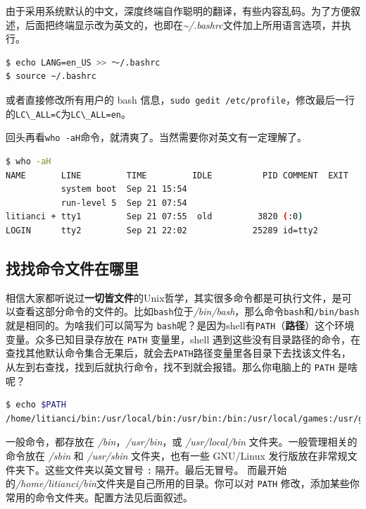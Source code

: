 \documentclass[doctor,openright,twoside]{sjtuthesis}
\newcommand{\passthrough}[1]{#1}
\theoremstyle{plain}
\theoremstyle{definition}
\theoremstyle{remark}
\theoremstyle{ocrenumbox}
\theoremstyle{plain}
\begin{document}
由于采用系统默认的中文，深度终端自作聪明的翻译，有些内容乱码。为了方便叙述，后面把终端显示改为英文的，也即在\emph{\textasciitilde/.bashrc}文件加上所用语言选项，并执行。

\begin{lstlisting}[language=bash]
$ echo LANG=en_US >> ～/.bashrc
$ source ~/.bashrc
\end{lstlisting}

或者直接修改所有用户的 bash 信息，\passthrough{\lstinline!sudo gedit /etc/profile!}，修改最后一行的\passthrough{\lstinline!LC\_ALL=C!}为\passthrough{\lstinline!LC\_ALL=en!}。

回头再看\passthrough{\lstinline!who -aH!}命令，就清爽了。当然需要你对英文有一定理解了。

\begin{lstlisting}[language=bash]
$ who -aH
NAME       LINE         TIME         IDLE          PID COMMENT  EXIT
           system boot  Sep 21 15:54
           run-level 5  Sep 21 07:54
litianci + tty1         Sep 21 07:55  old         3820 (:0)
LOGIN      tty2         Sep 21 22:02             25289 id=tty2
\end{lstlisting}

\hypertarget{section-42}{%
\subsection{找找命令文件在哪里}\label{section-42}}

相信大家都听说过\textbf{一切皆文件}的Unix哲学，其实很多命令都是可执行文件，是可以查看这部分命令的文件的。比如\passthrough{\lstinline!bash!}位于\emph{/bin/bash}，那么命令\passthrough{\lstinline!bash!}和\passthrough{\lstinline!/bin/bash!}就是相同的。为啥我们可以简写为 \passthrough{\lstinline!bash!}呢？是因为shell有\passthrough{\lstinline!PATH!}（\textbf{路径}）这个环境变量。众多已知目录存放在 \passthrough{\lstinline!PATH!} 变量里，shell 遇到这些没有目录路径的命令，在查找其他默认命令集合无果后，就会去\passthrough{\lstinline!PATH!}路径变量里各目录下去找该文件名，从左到右查找，找到后就执行命令，找不到就会报错。那么你电脑上的 \passthrough{\lstinline!PATH!} 是啥呢？

\begin{lstlisting}[language=bash]
$ echo $PATH
/home/litianci/bin:/usr/local/bin:/usr/bin:/bin:/usr/local/games:/usr/games:/sbin:/usr/sbin
\end{lstlisting}

一般命令，都存放在 \emph{/bin}，\emph{/usr/bin}，或 \emph{/usr/local/bin} 文件夹。一般管理相关的命令放在 \emph{/sbin} 和 \emph{/usr/sbin} 文件夹，也有一些 GNU/Linux 发行版放在非常规文件夹下。这些文件夹以英文冒号 \passthrough{\lstinline!:!} 隔开。最后无冒号。
而最开始的\emph{/home/litianci/bin}文件夹是自己所用的目录。你可以对 \passthrough{\lstinline!PATH!} 修改，添加某些你常用的命令文件夹。配置方法见后面叙述。
\end{document}
